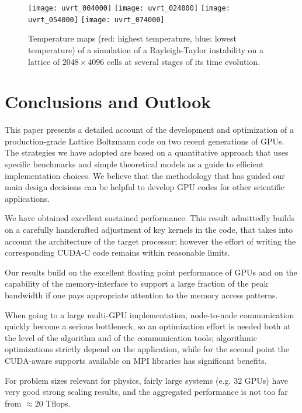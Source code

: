 \documentclass{elsarticle}
\begin{document}
\begin{figure}
\texttt{[image: uvrt\_004000]}
\texttt{[image: uvrt\_024000]}
\texttt{[image: uvrt\_054000]}
\texttt{[image: uvrt\_074000]}
\caption{\label{simulation}Temperature maps (red: highest temperature, 
blue: lowest temperature) of a simulation of a Rayleigh-Taylor 
instability on a lattice of $2048 \times 4096$ cells at several stages 
of its time evolution.}
\end{figure}

\section{Conclusions and Outlook}

This paper presents a detailed account of the development and 
optimization of a production-grade Lattice Boltzmann code on 
two recent generations of GPUs.
%
The strategies we have adopted are based on a quantitative approach that uses 
specific benchmarks and simple theoretical models as a guide to  
efficient implementation choices. We believe that the methodology that 
has guided our main design decisions can be helpful
to develop GPU codes for other scientific applications.

We have obtained excellent sustained performance. 
This result admittedly builds on a carefully handcrafted adjustment 
of key kernels in the code, that takes into account the architecture 
of the target processor; however the effort of writing the corresponding 
CUDA-C code remains within reasonable limits. 

Our results build on the excellent floating point performance of GPUs and 
on the capability of the memory-interface to support a large 
fraction of the peak bandwidth if one pays appropriate attention 
to the memory access patterns.

When going to a large multi-GPU implementation, node-to-node communication 
quickly become a serious bottleneck, so an optimization effort is needed 
both at the level of the algorithm and of the communication tools; 
algorithmic optimizations strictly depend on the application, while for 
the second point the CUDA-aware supports available on MPI 
libraries has significant benefits.

For problem sizes relevant for physics, fairly large systems (e.g. 32 GPUs) 
have very good strong scaling results, and the aggregated 
performance is not too far from $\approx 20$ Tflops.
\end{document}
